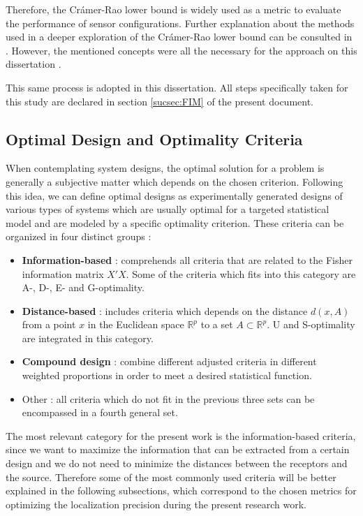 Therefore, the Crámer-Rao lower bound is widely used as a metric to evaluate the performance of sensor configurations. Further explanation about the methods used in a deeper exploration of the Crámer-Rao lower bound can be consulted in \cite{bishop-cramer-rao}. However, the mentioned concepts were all the necessary for the approach on this dissertation .

This same process is adopted in this dissertation. All steps specifically taken for this study are declared in section \ref{sucsec:FIM} of the present document.


\subsection{Optimal Design and Optimality Criteria}	\label{sec:optimaldesign}

When contemplating system designs, the optimal solution for a problem is generally a subjective matter which depends on the chosen criterion. Following this idea, we can define optimal designs as experimentally generated designs of various types of systems which are usually optimal for a targeted statistical model and are modeled by a specific optimality criterion. These criteria can be organized in four distinct groups \cite{compare-optimality-crit}:
\begin{itemize}
	\item \textbf{Information-based} : comprehends all criteria that are related to the Fisher information matrix $X'X$. Some of the criteria which fits into this category are A-, D-, E- and G-optimality.
	\item \textbf{Distance-based} : includes criteria which depends on the distance $d(x,A)$ from a point $x$ in the Euclidean space $\mathbb{R}^{p}$ to a set $A \subset \mathbb{R}^{p}$. U and S-optimality are integrated in this category.
	\item \textbf{Compound design} : combine different adjusted criteria in different weighted proportions in order to meet a desired statistical function.
	\item Other : all criteria which do not fit in the previous three sets can be encompassed in a fourth general set.
\end{itemize}

The most relevant category for the present work is the information-based criteria, since we want to maximize the information that can be extracted from a certain design and we do not need to minimize the distances between the receptors and the source. Therefore some of the most commonly used criteria will be better explained in the following subsections, which correspond to the chosen metrics for optimizing the localization precision during the present research work.

